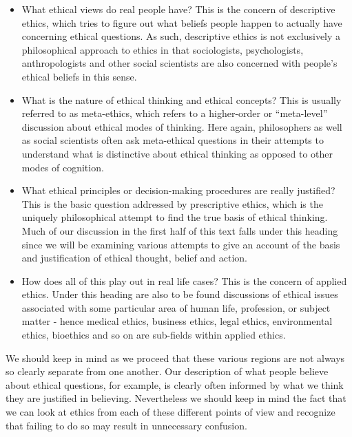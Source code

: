 \documentclass[justified]{tufte-book}
\providecommand{\tightlist}{%
  \setlength{\itemsep}{0pt}\setlength{\parskip}{0pt}}
\begin{document}
\begin{itemize}
\tightlist
\item
  What ethical views do real people have? This is the concern of descriptive ethics, which tries to figure out what beliefs people happen to actually have concerning ethical questions. As such, descriptive ethics is not exclusively a philosophical approach to ethics in that sociologists, psychologists, anthropologists and other social scientists are also concerned with people's ethical beliefs in this sense.
\item
  What is the nature of ethical thinking and ethical concepts? This is usually referred to as meta-ethics, which refers to a higher-order or ``meta-level'' discussion about ethical modes of thinking. Here again, philosophers as well as social scientists often ask meta-ethical questions in their attempts to understand what is distinctive about ethical thinking as opposed to other modes of cognition.
\item
  What ethical principles or decision-making procedures are really justified? This is the basic question addressed by prescriptive ethics, which is the uniquely philosophical attempt to find the true basis of ethical thinking. Much of our discussion in the first half of this text falls under this heading since we will be examining various attempts to give an account of the basis and justification of ethical thought, belief and action.
\item
  How does all of this play out in real life cases? This is the concern of applied ethics. Under this heading are also to be found discussions of ethical issues associated with some particular area of human life, profession, or subject matter - hence medical ethics, business ethics, legal ethics, environmental ethics, bioethics and so on are sub-fields within applied ethics.
\end{itemize}

We should keep in mind as we proceed that these various regions are not always so clearly separate from one another. Our description of what people believe about ethical questions, for example, is clearly often informed by what we think they are justified in believing. Nevertheless we should keep in mind the fact that we can look at ethics from each of these different points of view and recognize that failing to do so may result in unnecessary confusion.
\end{document}
